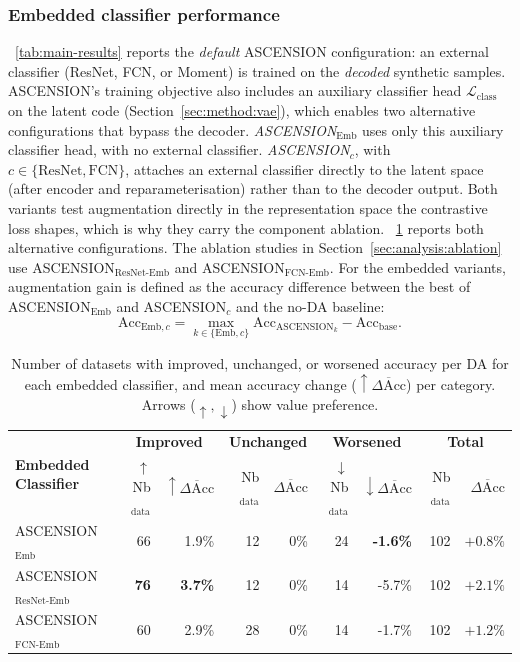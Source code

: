 \subsubsection{Embedded classifier performance}
\label{sec:results:embedded}

\tablename~\ref{tab:main-results} reports the \emph{default}
ASCENSION configuration: an external classifier (ResNet, FCN, or
Moment) is trained on the \emph{decoded} synthetic samples.
ASCENSION's training objective also includes an auxiliary
classifier head $\mathcal{L}_{\text{class}}$ on the latent code
(Section~\ref{sec:method:vae}), which enables two alternative
configurations that bypass the decoder.
\emph{ASCENSION$_{\text{Emb}}$} uses only this auxiliary classifier
head, with no external classifier.
\emph{ASCENSION$_{c}$}, with $c \in \{\text{ResNet}, \text{FCN}\}$,
attaches an external classifier directly to the latent space
(after encoder and reparameterisation) rather than to the decoder
output. Both variants test augmentation directly in the
representation space the contrastive loss shapes, which is why they
carry the component ablation. \tablename~\ref{tab:embedded} reports
both alternative configurations. The ablation studies in
Section~\ref{sec:analysis:ablation} use
ASCENSION$_{\text{ResNet-Emb}}$ and ASCENSION$_{\text{FCN-Emb}}$.
For the embedded variants, augmentation gain is defined as the
accuracy difference between the best of
ASCENSION$_{\text{Emb}}$ and ASCENSION$_{c}$ and the no-DA
baseline:
\begin{equation}
\mathrm{Acc}_{\text{Emb},c}
= \max_{k \in \{\text{Emb}, c\}} \mathrm{Acc}_{\text{ASCENSION}_{k}}
  - \mathrm{Acc}_{\text{base}}.
\end{equation}

\begin{table}[!htb]
\centering
\small
\caption{Number of datasets with improved, unchanged, or worsened
accuracy per DA for each embedded classifier, and mean accuracy
change ($\uparrow\overline{\Delta\mathrm{Acc}}$) per category.
Arrows ($\uparrow, \downarrow$) show value preference.}
\label{tab:embedded}
\begin{tabular}{@{}lrrrrrrrr@{}}
\toprule
\multirow{2}{*}{\textbf{Embedded Classifier}}
  & \multicolumn{2}{c}{\bf Improved}
  & \multicolumn{2}{c}{\bf Unchanged}
  & \multicolumn{2}{c}{\bf Worsened}
  & \multicolumn{2}{c}{\bf Total} \\
  & $\uparrow$Nb$_{\text{data}}$ & $\uparrow\overline{\Delta\mathrm{Acc}}$
  & Nb$_{\text{data}}$ & $\overline{\Delta\mathrm{Acc}}$
  & $\downarrow$Nb$_{\text{data}}$ & $\downarrow\overline{\Delta\mathrm{Acc}}$
  & Nb$_{\text{data}}$ & $\overline{\Delta\mathrm{Acc}}$ \\
\midrule
ASCENSION$_{\text{Emb}}$         & 66 & 1.9\% & 12 & 0\% & 24 & \textbf{-1.6\%} & 102 & $+0.8\%$ \\
ASCENSION$_{\text{ResNet-Emb}}$  & \textbf{76} & \textbf{3.7\%} & 12 & 0\% & 14 & -5.7\% & 102 & $\mathbf{+2.1\%}$ \\
ASCENSION$_{\text{FCN-Emb}}$     & 60 & 2.9\% & 28 & 0\% & 14 & -1.7\% & 102 & $+1.2\%$ \\
\bottomrule
\end{tabular}
\end{table}

